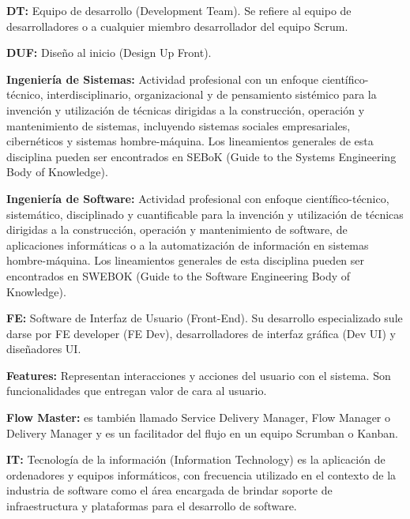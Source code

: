 \begin{description}
  \item {\textbf{DT:} Equipo de desarrollo (Development Team). Se refiere al equipo de desarrolladores o a cualquier miembro desarrollador del equipo Scrum.}
  
  \item {\textbf{DUF:} Diseño al inicio (Design Up Front).}

 
  \item {\textbf{Ingeniería de Sistemas:} Actividad profesional con un enfoque científico-técnico, interdisciplinario, organizacional y de pensamiento sistémico para la invención y utilización de técnicas dirigidas a la construcción, operación y mantenimiento de sistemas, incluyendo sistemas sociales empresariales, cibernéticos y sistemas hombre-máquina. Los lineamientos generales de esta disciplina pueden ser encontrados en SEBoK (Guide to the Systems Engineering Body of Knowledge).}
 
  \item {\textbf{Ingeniería de Software:} Actividad profesional con enfoque científico-técnico, sistemático, disciplinado y cuantificable para la invención y utilización de técnicas dirigidas a la construcción, operación y mantenimiento de software, de aplicaciones informáticas o a la automatización de información en sistemas hombre-máquina. Los lineamientos generales de esta disciplina pueden ser encontrados en SWEBOK (Guide to the Software Engineering Body of Knowledge).}


  \item {\textbf{FE:} Software de Interfaz de Usuario (Front-End). Su desarrollo especializado sule darse por FE developer (FE Dev), desarrolladores de interfaz gráfica (Dev UI) y diseñadores UI.}
  
  \item {\textbf{Features:} Representan interacciones y acciones del usuario con el sistema. Son funcionalidades que entregan valor de cara al usuario.}
  
  \item {\textbf{Flow Master:} es también llamado Service Delivery Manager, Flow Manager o Delivery Manager y es un facilitador del flujo en un equipo Scrumban o Kanban.}
    
  \item {\textbf{IT:} Tecnología de la información (Information Technology) es la aplicación de ordenadores y equipos informáticos, con frecuencia utilizado en el contexto de la industria de software como el área encargada de brindar soporte de infraestructura y plataformas para el desarrollo de software.}
  

\end{description}
